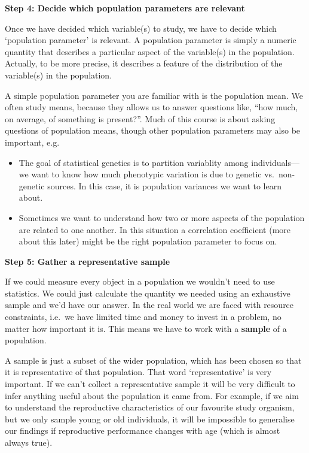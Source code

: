 \documentclass[]{book}
\begin{document}
\textbf{Step 4: Decide which population parameters are relevant}

Once we have decided which variable(s) to study, we have to decide which
`population parameter' is relevant. A population parameter is simply a
numeric quantity that describes a particular aspect of the variable(s)
in the population. Actually, to be more precise, it describes a feature
of the distribution of the variable(s) in the population.

A simple population parameter you are familiar with is the population
mean. We often study means, because they allows us to answer questions
like, ``how much, on average, of something is present?''. Much of this
course is about asking questions of population means, though other
population parameters may also be important, e.g.

\begin{itemize}
\item
  The goal of statistical genetics is to partition variablity among
  individuals---we want to know how much phenotypic variation is due to
  genetic vs.~non-genetic sources. In this case, it is population
  variances we want to learn about.
\item
  Sometimes we want to understand how two or more aspects of the
  population are related to one another. In this situation a correlation
  coefficient (more about this later) might be the right population
  parameter to focus on.
\end{itemize}

\textbf{Step 5: Gather a representative sample}

If we could measure every object in a population we wouldn't need to use
statistics. We could just calculate the quantity we needed using an
exhaustive sample and we'd have our answer. In the real world we are
faced with resource constraints, i.e.~we have limited time and money to
invest in a problem, no matter how important it is. This means we have
to work with a \textbf{sample} of a population.

A sample is just a subset of the wider population, which has been chosen
so that it is representative of that population. That word
`representative' is very important. If we can't collect a representative
sample it will be very difficult to infer anything useful about the
population it came from. For example, if we aim to understand the
reproductive characteristics of our favourite study organism, but we
only sample young or old individuals, it will be impossible to
generalise our findings if reproductive performance changes with age
(which is almost always true).
\end{document}
